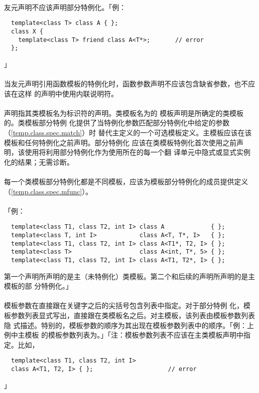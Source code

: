 \paragraph{}
友元声明不应该声明部分特例化。「例：
\begin{lstlisting}
  template<class T> class A { };
  class X {
    template<class T> friend class A<T*>;       // error
  };
\end{lstlisting}」

\paragraph{}
当友元声明引用函数模板的特例化时，函数参数声明不应该包含缺省参数，也不应该在这样
的声明中使用内联说明符。

\paragraph{}
声明指其类模板名为标识符的声明。类模板名为的
模板声明是所确定的类模板的。类模板部分特例
化提供了当特例化参数匹配部分特例化中给定的参数（\ref{temp.class.spec.match}）时
替代主定义的一个可选模板定义。主模板应该在该模板和任何特例化之前声明。部分特例化
应该在类模板特例化首次使用之前声明，该使用将利用部分特例化作为使用所在的每一个翻
译单元中隐式或显式实例化的结果；无需诊断。

\paragraph{}
每一个类模板部分特例化都是不同模板，应该为模板部分特例化的成员提供定义
（\ref{temp.class.spec.mfunc}）。

\paragraph{}
「例：
\begin{lstlisting}
  template<class T1, class T2, int I> class A             { };
  template<class T, int I>            class A<T, T*, I>   { };
  template<class T1, class T2, int I> class A<T1*, T2, I> { };
  template<class T>                   class A<int, T*, 5> { };
  template<class T1, class T2, int I> class A<T1, T2*, I> { };
\end{lstlisting}
第一个声明所声明的是主（未特例化）类模板。第二个和后续的声明所声明的是主模板的部
分特例化。」

\paragraph{}
模板参数在直接跟在关键字之后的尖括号包含列表中指定。对于部分特例
化，模板参数列表显式写出，直接跟在类模板名之后。对主模板，该列表由模板参数列表隐
式描述。特别的，模板参数的顺序为其出现在模板参数列表中的顺序。「例：上例中主模板
的模板参数列表为。」「注：模板参数列表不应该在主类模板声明中指
定。比如，
\begin{lstlisting}
  template<class T1, class T2, int I>
  class A<T1, T2, I> { };                     // error
\end{lstlisting}」

